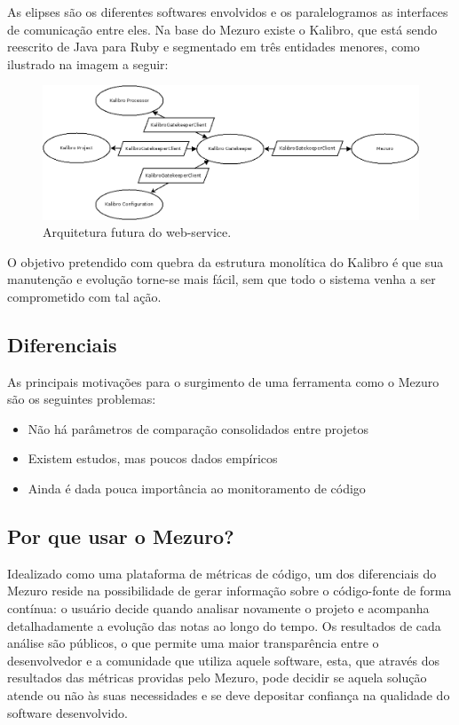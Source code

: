 \documentclass[12pt]{article}
\begin{document}
  As elipses são os diferentes softwares envolvidos e os paralelogramos as interfaces de comunicação entre eles. Na base do Mezuro existe o Kalibro, que está sendo reescrito
  de Java para Ruby e segmentado em três entidades menores, como ilustrado na imagem a seguir:
  \begin{figure}[h!]
    \centering
      \includegraphics[scale=0.45]{images/mezuro-architecture-predicted.png}
    \caption{Arquitetura futura do web-service.}
    \label{fig:architecture-1}
  \end{figure}

  O objetivo pretendido com quebra da estrutura monolítica do Kalibro é que sua manutenção e evolução torne-se mais fácil, sem que todo o sistema venha a ser comprometido com tal ação.
  \subsection{Diferenciais} \label{subsec:motivacao}
  As principais motivações para o surgimento de uma ferramenta como o Mezuro são os seguintes problemas:

  \begin{itemize}
      \item Não há parâmetros de comparação consolidados entre projetos
      \item Existem estudos, mas poucos dados empíricos
      \item Ainda é dada pouca importância ao monitoramento de código
  \end{itemize}

  \subsection{Por que usar o Mezuro?} \label{sec:projeto-mezuro}
  Idealizado como uma plataforma de métricas de código, um dos diferenciais do Mezuro reside na possibilidade de gerar informação sobre o código-fonte de forma contínua: o usuário decide quando analisar novamente o projeto e acompanha detalhadamente a evolução das notas ao longo do tempo. Os resultados de cada análise são públicos, o que permite uma maior transparência entre o desenvolvedor e a comunidade que utiliza aquele software, esta, que através dos resultados das métricas providas pelo Mezuro, pode decidir se aquela solução atende ou não às suas necessidades e se deve depositar confiança na qualidade do software desenvolvido.
\end{document}
